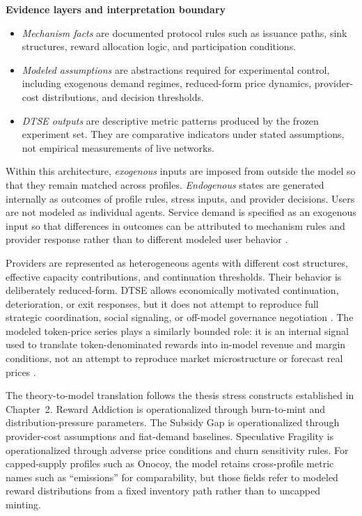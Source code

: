 \noindent\textbf{Evidence layers and interpretation boundary}
\begin{itemize}
    \item \emph{Mechanism facts} are documented protocol rules such as issuance paths, sink structures, reward allocation logic, and participation conditions.
    \item \emph{Modeled assumptions} are abstractions required for experimental control, including exogenous demand regimes, reduced-form price dynamics, provider-cost distributions, and decision thresholds.
    \item \emph{DTSE outputs} are descriptive metric patterns produced by the frozen experiment set. They are comparative indicators under stated assumptions, not empirical measurements of live networks.
\end{itemize}

Within this architecture, \emph{exogenous} inputs are imposed from outside the model so that they remain matched across profiles. \emph{Endogenous} states are generated internally as outcomes of profile rules, stress inputs, and provider decisions. Users are not modeled as individual agents. Service demand is specified as an exogenous input so that differences in outcomes can be attributed to mechanism rules and provider response rather than to different modeled user behavior \cite{Morris2019, Braakman2022}.

Providers are represented as heterogeneous agents with different cost structures, effective capacity contributions, and continuation thresholds. Their behavior is deliberately reduced-form. DTSE allows economically motivated continuation, deterioration, or exit responses, but it does not attempt to reproduce full strategic coordination, social signaling, or off-model governance negotiation \cite{Collins2024, McCulloch2022}. The modeled token-price series plays a similarly bounded role: it is an internal signal used to translate token-denominated rewards into in-model revenue and margin conditions, not an attempt to reproduce market microstructure or forecast real prices \cite{Morris2019, Collins2024}.

The theory-to-model translation follows the thesis stress constructs established in Chapter~2. Reward Addiction is operationalized through burn-to-mint and distribution-pressure parameters. The Subsidy Gap is operationalized through provider-cost assumptions and fiat-demand baselines. Speculative Fragility is operationalized through adverse price conditions and churn sensitivity rules. For capped-supply profiles such as Onocoy, the model retains cross-profile metric names such as ``emissions'' for comparability, but those fields refer to modeled reward distributions from a fixed inventory path rather than to uncapped minting.

